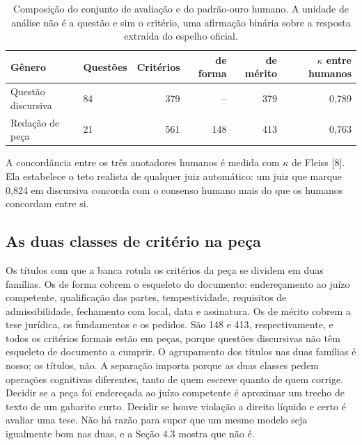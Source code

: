 \documentclass{IOS-Book-Article}
\begin{document}
\begin{table}[!ht]
\centering
\caption{Composição do conjunto de avaliação e do padrão-ouro humano. A unidade de análise não é a questão e sim o critério, uma afirmação binária sobre a resposta extraída do espelho oficial.}
\footnotesize\setlength{\tabcolsep}{2pt}
\begin{tabular}{llrrrr}
\hline
\textbf{Gênero} & \textbf{Questões} & \textbf{Critérios} & \textbf{de forma} & \textbf{de mérito} & \textbf{$\kappa$ entre humanos} \\
\hline
Questão discursiva & 84 & 379 & -- & 379 & 0,789 \\
Redação de peça & 21 & 561 & 148 & 413 & 0,763 \\
\hline
\end{tabular}
\par\vspace{3pt}\begin{minipage}{\textwidth}\footnotesize A concordância entre os três anotadores humanos é medida com $\kappa$ de Fleiss [8]. Ela estabelece o teto realista de qualquer juiz automático: um juiz que marque 0,824 em discursiva concorda com o consenso humano mais do que os humanos concordam entre si.\end{minipage}
\end{table}


\subsection{As duas classes de critério na peça}

Os títulos com que a banca rotula os critérios da peça se dividem em duas famílias. Os de forma cobrem o esqueleto do documento: endereçamento ao juízo competente, qualificação das partes, tempestividade, requisitos de admissibilidade, fechamento com local, data e assinatura. Os de mérito cobrem a tese jurídica, os fundamentos e os pedidos. São 148 e 413, respectivamente, e todos os critérios formais estão em peças, porque questões discursivas não têm esqueleto de documento a cumprir. O agrupamento dos títulos nas duas famílias é nosso; os títulos, não. A separação importa porque as duas classes pedem operações cognitivas diferentes, tanto de quem escreve quanto de quem corrige. Decidir se a peça foi endereçada ao juízo competente é aproximar um trecho de texto de um gabarito curto. Decidir se houve violação a direito líquido e certo é avaliar uma tese. Não há razão para supor que um mesmo modelo seja igualmente bom nas duas, e a Seção 4.3 mostra que não é.
\end{document}

